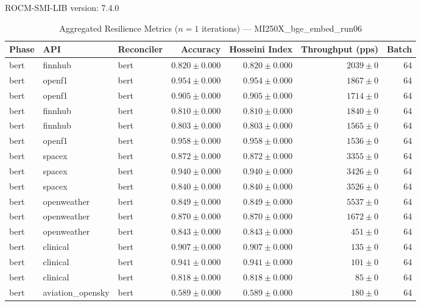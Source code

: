 ROCM-SMI-LIB version: 7.4.0

\begin{table}[htbp]
\caption{Aggregated Resilience Metrics ($n=1$ iterations) --- MI250X_bge_embed_run06}
\begin{tabular}{l l l r r r r}
\hline
Phase & API & Reconciler & Accuracy & Hosseini Index & Throughput (pps) & Batch \\
\hline
bert & finnhub & bert & $0.820\pm0.000$ & $0.820\pm0.000$ & $2039\pm0$ & 64 \\
bert & openf1 & bert & $0.954\pm0.000$ & $0.954\pm0.000$ & $1867\pm0$ & 64 \\
bert & openf1 & bert & $0.905\pm0.000$ & $0.905\pm0.000$ & $1714\pm0$ & 64 \\
bert & finnhub & bert & $0.810\pm0.000$ & $0.810\pm0.000$ & $1840\pm0$ & 64 \\
bert & finnhub & bert & $0.803\pm0.000$ & $0.803\pm0.000$ & $1565\pm0$ & 64 \\
bert & openf1 & bert & $0.958\pm0.000$ & $0.958\pm0.000$ & $1536\pm0$ & 64 \\
bert & spacex & bert & $0.872\pm0.000$ & $0.872\pm0.000$ & $3355\pm0$ & 64 \\
bert & spacex & bert & $0.940\pm0.000$ & $0.940\pm0.000$ & $3426\pm0$ & 64 \\
bert & spacex & bert & $0.840\pm0.000$ & $0.840\pm0.000$ & $3526\pm0$ & 64 \\
bert & openweather & bert & $0.849\pm0.000$ & $0.849\pm0.000$ & $5537\pm0$ & 64 \\
bert & openweather & bert & $0.870\pm0.000$ & $0.870\pm0.000$ & $1672\pm0$ & 64 \\
bert & openweather & bert & $0.843\pm0.000$ & $0.843\pm0.000$ & $451\pm0$ & 64 \\
bert & clinical & bert & $0.907\pm0.000$ & $0.907\pm0.000$ & $135\pm0$ & 64 \\
bert & clinical & bert & $0.941\pm0.000$ & $0.941\pm0.000$ & $101\pm0$ & 64 \\
bert & clinical & bert & $0.818\pm0.000$ & $0.818\pm0.000$ & $85\pm0$ & 64 \\
bert & aviation\_opensky & bert & $0.589\pm0.000$ & $0.589\pm0.000$ & $180\pm0$ & 64 \\

\end{tabular}
\end{table}
